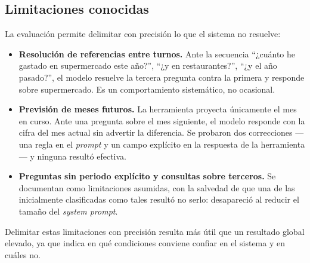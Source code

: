 \subsection{Limitaciones conocidas}

La evaluación permite delimitar con precisión lo que el sistema no resuelve:

\begin{itemize}
    \item \textbf{Resolución de referencias entre turnos.} Ante la secuencia
    ``¿cuánto he gastado en supermercado este año?'', ``¿y en restaurantes?'',
    ``¿y el año pasado?'', el modelo resuelve la tercera pregunta contra la
    primera y responde sobre supermercado. Es un comportamiento sistemático, no
    ocasional.

    \item \textbf{Previsión de meses futuros.} La herramienta proyecta
    únicamente el mes en curso. Ante una pregunta sobre el mes siguiente, el
    modelo responde con la cifra del mes actual sin advertir la diferencia. Se
    probaron dos correcciones —una regla en el \textit{prompt} y un campo
    explícito en la respuesta de la herramienta— y ninguna resultó efectiva.

    \item \textbf{Preguntas sin periodo explícito y consultas sobre terceros.}
    Se documentan como limitaciones asumidas, con la salvedad de que una de las
    inicialmente clasificadas como tales resultó no serlo: desapareció al
    reducir el tamaño del \textit{system prompt}.
\end{itemize}

Delimitar estas limitaciones con precisión resulta más útil que un resultado
global elevado, ya que indica en qué condiciones conviene confiar en el sistema
y en cuáles no.
